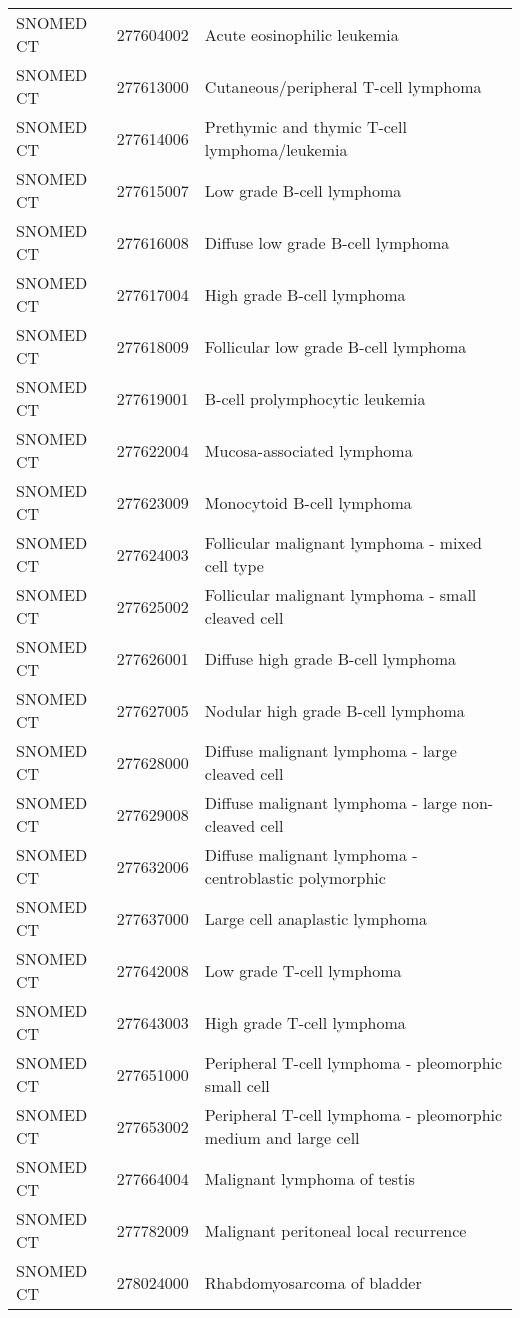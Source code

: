\begin{longtable}{p{}p{}p{}}
  SNOMED CT & 277604002 & Acute eosinophilic leukemia \\ 
  SNOMED CT & 277613000 & Cutaneous/peripheral T-cell lymphoma \\ 
  SNOMED CT & 277614006 & Prethymic and thymic T-cell lymphoma/leukemia \\ 
  SNOMED CT & 277615007 & Low grade B-cell lymphoma \\ 
  SNOMED CT & 277616008 & Diffuse low grade B-cell lymphoma \\ 
  SNOMED CT & 277617004 & High grade B-cell lymphoma \\ 
  SNOMED CT & 277618009 & Follicular low grade B-cell lymphoma \\ 
  SNOMED CT & 277619001 & B-cell prolymphocytic leukemia \\ 
  SNOMED CT & 277622004 & Mucosa-associated lymphoma \\ 
  SNOMED CT & 277623009 & Monocytoid B-cell lymphoma \\ 
  SNOMED CT & 277624003 & Follicular malignant lymphoma - mixed cell type \\ 
  SNOMED CT & 277625002 & Follicular malignant lymphoma - small cleaved cell \\ 
  SNOMED CT & 277626001 & Diffuse high grade B-cell lymphoma \\ 
  SNOMED CT & 277627005 & Nodular high grade B-cell lymphoma \\ 
  SNOMED CT & 277628000 & Diffuse malignant lymphoma - large cleaved cell \\ 
  SNOMED CT & 277629008 & Diffuse malignant lymphoma - large non-cleaved cell \\ 
  SNOMED CT & 277632006 & Diffuse malignant lymphoma - centroblastic polymorphic \\ 
  SNOMED CT & 277637000 & Large cell anaplastic lymphoma \\ 
  SNOMED CT & 277642008 & Low grade T-cell lymphoma \\ 
  SNOMED CT & 277643003 & High grade T-cell lymphoma \\ 
  SNOMED CT & 277651000 & Peripheral T-cell lymphoma - pleomorphic small cell \\ 
  SNOMED CT & 277653002 & Peripheral T-cell lymphoma - pleomorphic medium and large cell \\ 
  SNOMED CT & 277664004 & Malignant lymphoma of testis \\ 
  SNOMED CT & 277782009 & Malignant peritoneal local recurrence \\ 
  SNOMED CT & 278024000 & Rhabdomyosarcoma of bladder \\ 

\end{longtable}
